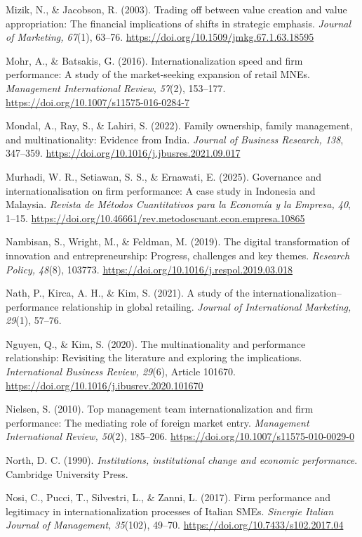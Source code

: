 \documentclass[
  a4paper,
  13pt]{extreport}
\begin{document}
Mizik, N., \& Jacobson, R. (2003). Trading off between value creation
and value appropriation: The financial implications of shifts in
strategic emphasis. \emph{Journal of Marketing, 67}(1), 63--76.
\url{https://doi.org/10.1509/jmkg.67.1.63.18595}

Mohr, A., \& Batsakis, G. (2016). Internationalization speed and firm
performance: A study of the market-seeking expansion of retail MNEs.
\emph{Management International Review, 57}(2), 153--177.
\url{https://doi.org/10.1007/s11575-016-0284-7}

Mondal, A., Ray, S., \& Lahiri, S. (2022). Family ownership, family
management, and multinationality: Evidence from India. \emph{Journal of
Business Research, 138}, 347--359.
\url{https://doi.org/10.1016/j.jbusres.2021.09.017}

Murhadi, W. R., Setiawan, S. S., \& Ernawati, E. (2025). Governance and
internationalisation on firm performance: A case study in Indonesia and
Malaysia. \emph{Revista de Métodos Cuantitativos para la Economía y la
Empresa, 40}, 1--15.
\url{https://doi.org/10.46661/rev.metodoscuant.econ.empresa.10865}

Nambisan, S., Wright, M., \& Feldman, M. (2019). The digital
transformation of innovation and entrepreneurship: Progress, challenges
and key themes. \emph{Research Policy, 48}(8), 103773.
\url{https://doi.org/10.1016/j.respol.2019.03.018}

Nath, P., Kirca, A. H., \& Kim, S. (2021). A study of the
internationalization--performance relationship in global retailing.
\emph{Journal of International Marketing, 29}(1), 57--76.

Nguyen, Q., \& Kim, S. (2020). The multinationality and performance
relationship: Revisiting the literature and exploring the implications.
\emph{International Business Review, 29}(6), Article 101670.
\url{https://doi.org/10.1016/j.ibusrev.2020.101670}

Nielsen, S. (2010). Top management team internationalization and firm
performance: The mediating role of foreign market entry.
\emph{Management International Review, 50}(2), 185--206.
\url{https://doi.org/10.1007/s11575-010-0029-0}

North, D. C. (1990). \emph{Institutions, institutional change and
economic performance}. Cambridge University Press.

Nosi, C., Pucci, T., Silvestri, L., \& Zanni, L. (2017). Firm
performance and legitimacy in internationalization processes of Italian
SMEs. \emph{Sinergie Italian Journal of Management, 35}(102), 49--70.
\url{https://doi.org/10.7433/s102.2017.04}
\end{document}
